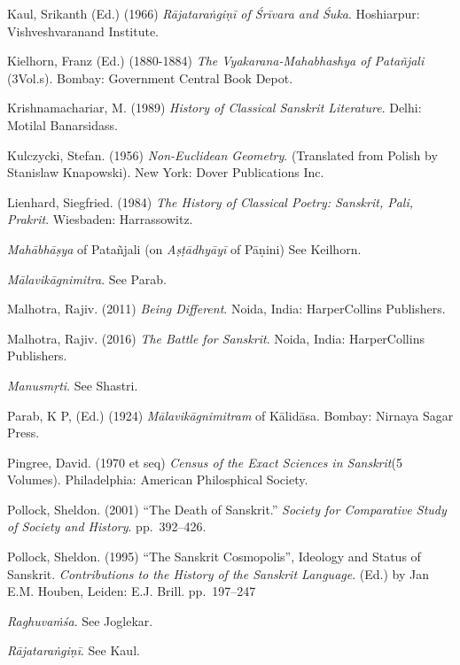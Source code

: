 \begin{thebibliography}{99}
Kaul, Srikanth (Ed.) (1966) {\sl Rājataraṅgiṇī of Śrīvara and Śuka}. Hoshiarpur: Vishveshvaranand Institute.

Kielhorn, Franz (Ed.) (1880-1884) {\sl The Vyakarana-Mahabhashya of Patañjali} (3Vol.s). Bombay: Government Central Book Depot.

Krishnamachariar, M. (1989) {\sl History of Classical Sanskrit Literature}. Delhi: Motilal Banarsidass.

Kulczycki, Stefan. (1956) {\sl Non-Euclidean Geometry}. (Translated from Polish by Stanislaw Knapowski). New York: Dover Publications Inc.

Lienhard, Siegfried. (1984) {\sl The History of Classical Poetry: Sanskrit, Pali, Prakrit}. Wiesbaden: Harrassowitz.

{\sl Mahābhāṣya} of Patañjali (on {\sl Aṣṭādhyāyī} of Pāṇini) See Keilhorn.

{\sl Mālavikāgnimitra}. See Parab. 

Malhotra, Rajiv. (2011) {\sl Being Different}. Noida, India: HarperCollins Publishers.

Malhotra, Rajiv. (2016) {\sl The Battle for Sanskrit}. Noida, India: HarperCollins Publishers.

{\sl Manusmṛti}. See Shastri.

Parab, K P, (Ed.) (1924) {\sl Mālavikāgnimitram} of Kālidāsa. Bombay: Nirnaya Sagar Press.

Pingree, David. (1970 et seq) {\sl Census of the Exact Sciences in Sanskrit}\break (5 Volumes). Philadelphia: American Philosphical Society.

Pollock, Sheldon. (2001) “The Death of Sanskrit.” {\sl Society for Comparative Study of Society and History}. pp.~392--426.

Pollock, Sheldon. (1995) “The Sanskrit Cosmopolis”, Ideology and Status of Sanskrit. {\sl Contributions to the History of the Sanskrit Language}. (Ed.) by Jan E.M. Houben, Leiden: E.J. Brill. pp.~197--247

{\sl Raghuvaṁśa}. See Joglekar.

{\sl Rājataraṅgiṇī}. See Kaul.


\end{thebibliography}
